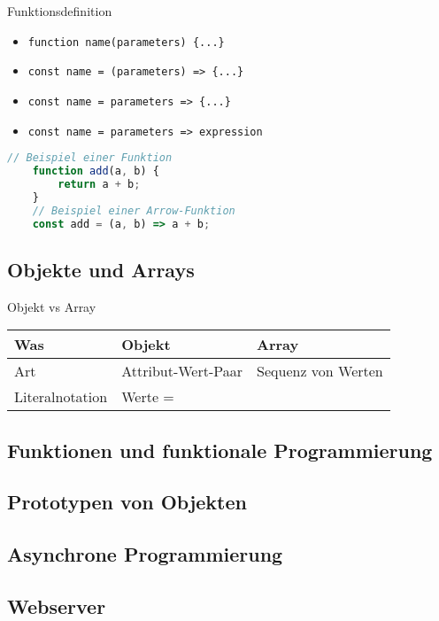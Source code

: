 \begin{code}{Funktionsdefinition}
    \begin{itemize}
        \item \texttt{function name(parameters) \{...\}}
        \item \texttt{const name = (parameters) => \{...\}}
        \item \texttt{const name = parameters => \{...\}}
        \item \texttt{const name = parameters => expression}
    \end{itemize}
\end{code}

\begin{lstlisting}[language=JavaScript]
    // Beispiel einer Funktion
    function add(a, b) {
        return a + b;
    }
    // Beispiel einer Arrow-Funktion
    const add = (a, b) => a + b;
\end{lstlisting}


\subsection{Objekte und Arrays}

\begin{concept}{Objekt vs Array}
    \begin{tabular}{lll}
        Was & Objekt & Array\\
        \hline
        Art & Attribut-Wert-Paar & Sequenz von Werten\\
        Literalnotation & Werte =
        
    \end{tabular}
\end{concept}

\subsection{Funktionen und funktionale Programmierung}

\subsection{Prototypen von Objekten}

\subsection{Asynchrone Programmierung}

\subsection{Webserver}